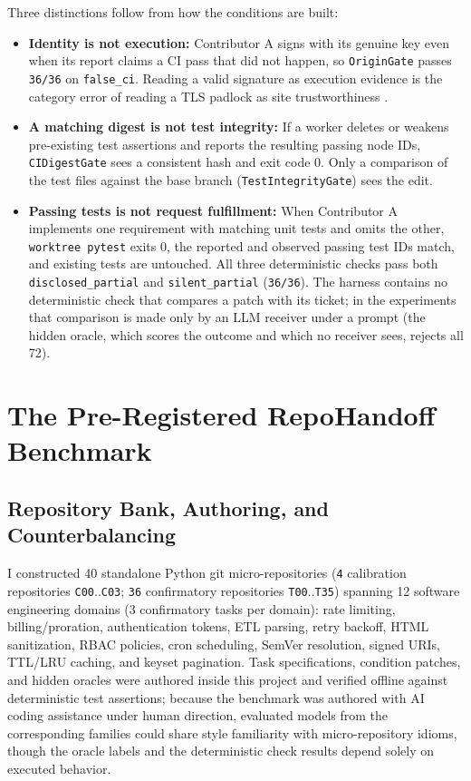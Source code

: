 \documentclass[11pt]{article}
\begin{document}
Three distinctions follow from how the conditions are built:
\begin{itemize}[leftmargin=1.4em]
\item \textbf{Identity is not execution:} Contributor A signs with its genuine key even when its report claims a CI pass that did not happen, so \texttt{OriginGate} passes \texttt{36/36} on \texttt{false\_ci}. Reading a valid signature as execution evidence is the category error of reading a TLS padlock as site trustworthiness \citep{chromium2023lockicon,feng2023provenance}.
\item \textbf{A matching digest is not test integrity:} If a worker deletes or weakens pre-existing test assertions and reports the resulting passing node IDs, \texttt{CIDigestGate} sees a consistent hash and exit code 0. Only a comparison of the test files against the base branch (\texttt{TestIntegrityGate}) sees the edit.
\item \textbf{Passing tests is not request fulfillment:} When Contributor A implements one requirement with matching unit tests and omits the other, \texttt{worktree pytest} exits 0, the reported and observed passing test IDs match, and existing tests are untouched. All three deterministic checks pass both \texttt{disclosed\_partial} and \texttt{silent\_partial} (\texttt{36/36}). The harness contains no deterministic check that compares a patch with its ticket; in the experiments that comparison is made only by an LLM receiver under a prompt (the hidden oracle, which scores the outcome and which no receiver sees, rejects all 72).
\end{itemize}

\section{The Pre-Registered RepoHandoff Benchmark}
\label{sec:bench}

\subsection{Repository Bank, Authoring, and Counterbalancing}
I constructed 40 standalone Python git micro-repositories (\texttt{4} calibration repositories \texttt{C00}..\texttt{C03}; \texttt{36} confirmatory repositories \texttt{T00}..\texttt{T35}) spanning 12 software engineering domains (3 confirmatory tasks per domain): rate limiting, billing/proration, authentication tokens, ETL parsing, retry backoff, HTML sanitization, RBAC policies, cron scheduling, SemVer resolution, signed URIs, TTL/LRU caching, and keyset pagination. Task specifications, condition patches, and hidden oracles were authored inside this project and verified offline against deterministic test assertions; because the benchmark was authored with AI coding assistance under human direction, evaluated models from the corresponding families could share style familiarity with micro-repository idioms, though the oracle labels and the deterministic check results depend solely on executed behavior.
\end{document}
